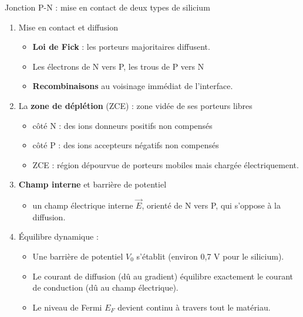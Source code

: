 \begin{frame}{Jonction P-N : mise en contact de deux types de silicium }

\begin{enumerate}
  \item Mise en contact et diffusion
  \begin{itemize}
    \item \textbf{Loi de Fick} : les porteurs majoritaires diffusent.
    \item Les électrons de N vers P, les trous de P vers N
    \item \textbf{Recombinaisons} au voisinage immédiat de l'interface.
  \end{itemize}
  \item La \textbf{zone de déplétion} (ZCE) : zone vidée de ses porteurs libres
  \begin{itemize}
    \item côté N : des ions donneurs positifs non compensés
    \item côté P : des ions accepteurs négatifs non compensés
    \item ZCE : région dépourvue de porteurs mobiles mais chargée électriquement.
  \end{itemize}

  \item \textbf{Champ interne} et barrière de potentiel
  \begin{itemize}
    \item un champ électrique interne $\vec{E}$, orienté de N vers P, qui s'oppose à la diffusion.
  \end{itemize}

  \item Équilibre dynamique :
  \begin{itemize}
    \item Une barrière de potentiel $V_0$ s'établit (environ 0,7 V pour le silicium).
    \item Le courant de diffusion (dû au gradient) équilibre exactement le courant de conduction (dû  au champ électrique).
    \item Le niveau de Fermi $E_F$ devient continu à travers tout le matériau.
  \end{itemize}
\end{enumerate}
\end{frame}

